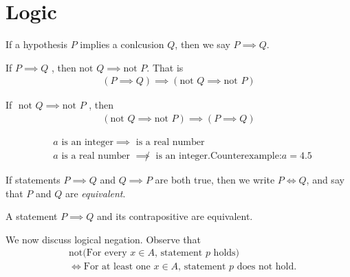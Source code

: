 \section{Logic} 
\begin{notation}
	If a hypothesis $P$ implies a conlcusion $Q$, then we say $P \implies Q$.
\end{notation}
\begin{lemma}[Contrapositive]\label{lem:contrapositive}
	If $P \implies Q $ , then $ \text{not } Q \implies \text{not } P$. That is
	\begin{equation*}
	\begin{split}
		( P \implies Q )  \implies \left( \text{not } Q  \implies \text{not }
		P\right) 
	\end{split}
	\end{equation*}
\end{lemma}
\begin{corollary}
	If $ \text{ not } Q  \implies \text{not }  P  $ , then
	\begin{equation*}
	\begin{split}
		\left(  \text{not } Q   \implies \text{not }  P\right) \implies (P
		\implies Q) 
	\end{split}
	\end{equation*}
\end{corollary}
\begin{example} 
	\begin{equation*}
	\begin{split}
		& a \text{ is an integer} \implies  \text{ is a real number} \\
		& a \text{ is a real number } \not \implies  \text{ is an integer.}
		\text{Counterexample:} a =4.5
	\end{split}
	\end{equation*}
\end{example}
\begin{notation}
	If statements $P \implies Q$ and $Q \implies P$ are both true, then we 
	write $P \iff Q$, and say that $P$ and $Q$ are \emph{equivalent}.
\end{notation}
\begin{example}
	A statement $P \implies Q$ and its contrapositive are equivalent.
\end{example}
We now discuss logical negation. Observe that
\begin{equation*}
\begin{split}
	& \text{not(For every $x \in A$, statement $p$ holds)} 
	\\
	& \iff \text{For at least one $x \in A$, statement $p$ does not hold.}
\end{split}
\end{equation*}
